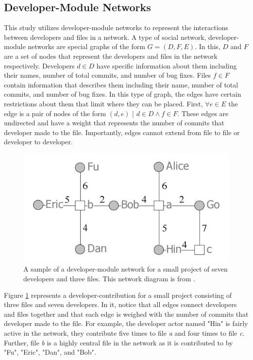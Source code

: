 \documentclass{sig-alternate-05-2015}
\begin{document}
\subsection{Developer-Module Networks}
This study utilizes developer-module networks to represent the interactions between developers and files in a network. A type of social network, developer-module networks are special graphs of the form \(G = (D, F, E)\). In this, \(D\) and \(F\) are a set of nodes that represent the developers and files in the network respectively. Developers \(d \in D\) have specific information about them including their names, number of total commits, and number of bug fixes. Files \(f \in F\) contain information that describes them including their name, number of total commits, and number of bug fixes. In this type of graph, the edges have certain restrictions about them that limit where they can be placed. First, \(\forall e \in E\) the edge is a pair of nodes of the form \((d, e)\) | \(d \in D \wedge f \in F\). These edges are undirected and have a weight that represents the number of commits that developer made to the file. Importantly, edges cannot extend from file to file or developer to developer.

\begin{figure}
\centering
\includegraphics[scale=0.5]{network}
\caption{A sample of a developer-module network for a small project of seven developers and three files. This network diagram is from \cite{pingzer:networks}.}
\label{fig:network}
\end{figure}

Figure \ref{fig:network} represents a developer-contribution for a small project consisting of three files and seven developers. In it, notice that all edges connect developers and files together and that each edge is weighed with the number of commits that developer made to the file. For example, the developer actor named "Hin" is fairly active in the network, they contribute five times to file \textit{a} and four times to file \textit{c}.  Further, file \textit{b} is a highly central file in the network as it is contributed to by "Fu", "Eric", "Dan", and "Bob".
\end{document}

